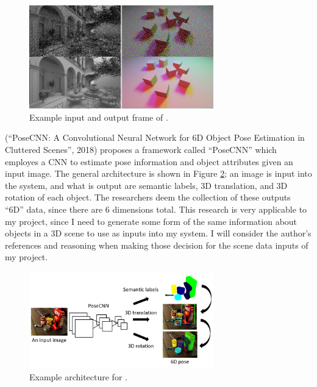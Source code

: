 \documentclass[conference]{IEEEtran}
\begin{document}
\begin{figure}[htbp]
\centerline{\includegraphics[width=8cm]{spatiotemporal.png}}
\caption{Example input and output frame of \cite{ref:spatiotemporal}.}
\label{fig:spatiotemporal}
\end{figure}

\cite{ref:posecnn} (``PoseCNN: A Convolutional Neural Network for 6D Object Pose Estimation in
Cluttered Scenes'', 2018) proposes a framework called ``PoseCNN'' which
employes a CNN to estimate pose information and object attributes given an input
image. The general architecture is shown in Figure \ref{fig:posecnn}; an image
is input into the system, and what is output are semantic labels, 3D
translation, and 3D rotation of each object. The researchers deem the collection
of these outputs ``6D'' data, since there are 6 dimensions total. This
research is very applicable to my project, since I need to generate some form of
the same information about objects in a 3D scene to use as inputs into my
system. I will consider the author's references and reasoning when making those
decision for the scene data inputs of my project.

\begin{figure}[htbp]
\centerline{\includegraphics[width=8cm]{posecnn.png}}
\caption{Example architecture for \cite{ref:posecnn}.}
\label{fig:posecnn}
\end{figure}
\end{document}
